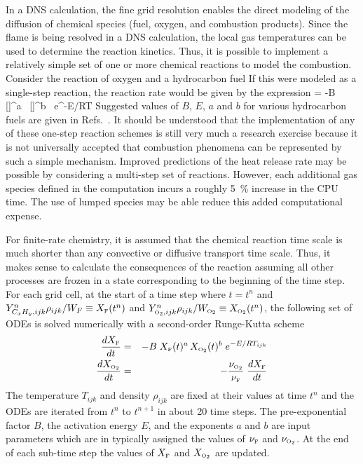 In a DNS calculation, the fine grid resolution enables the direct modeling of the diffusion of chemical species (fuel,
oxygen, and combustion products).  Since the flame is being resolved in a DNS calculation, the local gas
temperatures can be used to determine the reaction kinetics.  Thus, it is possible to implement a relatively simple
set of one or more chemical reactions to model the combustion. Consider the reaction of oxygen and a hydrocarbon
fuel
\be  {}   \ee
If this were modeled as a single-step reaction, the reaction rate would be given by the expression
\be {} = -B \, []^a \, []^b \, e^{-E/RT}
   \label{reaction} \ee
Suggested values of $B$, $E$, $a$ and $b$ for various hydrocarbon
fuels are given
in Refs.~\cite{Puri:1,Westbrook:1}. It should be understood that the
implementation of any of these one-step reaction schemes is still very
much a research exercise because it is not universally accepted that
combustion phenomena can be represented by such a simple mechanism.
Improved predictions of the heat release rate may be possible by considering a multi-step set of reactions.
However, each additional gas species defined in the computation incurs a roughly 5~\% increase in the CPU time.  The use of lumped species may be able reduce this added computational expense.

For finite-rate chemistry, it is assumed that the chemical reaction
time scale is much shorter than any convective or diffusive
transport time scale. Thus, it makes sense to calculate the
consequences of the reaction assuming all other processes are
frozen in a state corresponding to the beginning of the time step.
For each grid cell, at the start of a time step where $t=t^n$ and
$Y_{C_x H_y,ijk}^n \rho_{ijk}/ W_F       \equiv X_{\tiny \hbox{F}}(t^n)$ and
$Y_{{\tiny \hbox{O}_2},ijk}^n   \rho_{ijk}/ W_{\tiny \hbox{O}_2} \equiv X_{\tiny \hbox{O}_2}(t^n)$,
the following set of ODEs is solved numerically with a second-order Runge-Kutta scheme
\begin{eqnarray}
\frac{dX_{\tiny \hbox{F}}}{dt}    &=& -B \; X_{\tiny \hbox{F}}(t)^a \, X_{\tiny \hbox{O}_2}(t)^b \; e^{-E/RT_{ijk}} \label{finitefuel} \\
\frac{dX_{\tiny \hbox{O}_2}}{dt} &=& -\frac{\nu_{\tiny \hbox{O}_2}}{\nu_{\tiny \hbox{F}}} \; \frac{dX_{\tiny \hbox{F}}}{dt} \label{finiteoxidizer}
\end{eqnarray}
The temperature $T_{ijk}$ and density $\rho_{ijk}$ are fixed at
their values at time
$t^n$ and the ODEs are iterated from $t^n$ to $t^{n+1}$ in about 20 time
steps. The pre-exponential factor $B$, the activation energy
$E$, and the exponents $a$ and $b$ are input parameters which are in typically assigned the values of
$\nu_{\tiny \hbox{F}}$ and $\nu_{\tiny \hbox{O}_2}$.  At the end of each sub-time step the values of $X_{\tiny \hbox{F}}$ and $X_{\tiny \hbox{O}_2}$ are updated.


